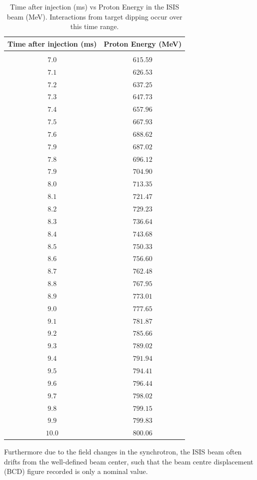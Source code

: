 \documentclass[a4paper,11pt]{article}
\begin{document}
\begin{table}
\centering
\label{Table:Inj}
\begin{tabular}{ c c }
\hline Time after injection (ms) & Proton Energy (MeV) \\
\hline \vspace{-2.5mm} \\
$7.0$ & $615.59$ \\ \hline
$7.1$ & $626.53$ \\
$7.2$ & $637.25$ \\
$7.3$ & $647.73$ \\
$7.4$ & $657.96$ \\
$7.5$ & $667.93$ \\
$7.6$ & $688.62$ \\
$7.9$ & $687.02$ \\
$7.8$ & $696.12$ \\
$7.9$ & $704.90$ \\ \hline
$8.0$ & $713.35$ \\ \hline
$8.1$ & $721.47$ \\
$8.2$ & $729.23$ \\
$8.3$ & $736.64$ \\
$8.4$ & $743.68$ \\
$8.5$ & $750.33$ \\
$8.6$ & $756.60$ \\
$8.7$ & $762.48$ \\
$8.8$ & $767.95$ \\
$8.9$ & $773.01$ \\ \hline
$9.0$ & $777.65$ \\ \hline
$9.1$ & $781.87$ \\
$9.2$ & $785.66$ \\
$9.3$ & $789.02$ \\
$9.4$ & $791.94$ \\
$9.5$ & $794.41$ \\
$9.6$ & $796.44$ \\
$9.7$ & $798.02$ \\
$9.8$ & $799.15$ \\
$9.9$ & $799.83$ \\ \hline
$10.0$ & $800.06$ \\
\hline
\end{tabular}
\caption{Time after injection (ms) vs Proton Energy in the ISIS beam (MeV). Interactions from target dipping occur over this time range.}
\end{table}

 Furthermore due to the field changes in the synchrotron, the ISIS beam often drifts from the well-defined beam center, such that the beam centre displacement (BCD) figure recorded is only a nominal value. 
\end{document}
